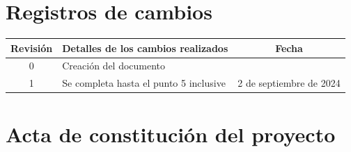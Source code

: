\documentclass[
11pt, %
codirector, %
]{charter}
\begin{document}
\maketitle
\thispagestyle{empty}
\pagebreak


\thispagestyle{empty}
{\setlength{\parskip}{0pt}
	\tableofcontents{}
}
\pagebreak


\section*{Registros de cambios}
\label{sec:registro}


\begin{table}[ht]
	\label{tab:registro}
	\centering
	\begin{tabularx}{\linewidth}{@{}|c|X|c|@{}}
		\hline
		\rowcolor[HTML]{C0C0C0}
		Revisión & \multicolumn{1}{c|}{\cellcolor[HTML]{C0C0C0}Detalles de los cambios realizados} & Fecha                       \\ \hline
		0        & Creación del documento                                                          & \fechaInicioName            \\ \hline
		1        & Se completa hasta el punto 5 inclusive                                          & {2} de {septiembre} de 2024 \\ \hline

	\end{tabularx}
\end{table}

\pagebreak



\section*{Acta de constitución del proyecto}
\label{sec:acta}
\end{document}
